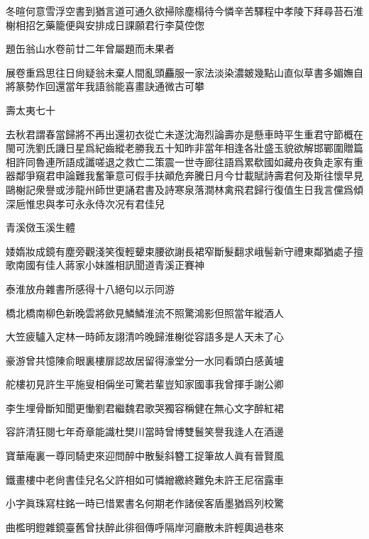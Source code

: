 \documentclass{zhvt-classic-Miya}
\begin{document}
冬暄何意雪浮空書到猶言道可通久欲掃除塵榻待今憐辛苦驛程中孝陵下拜尋苔石淮榭相招乞藥籠便與安排成日課願君行李莫倥偬

\begin{fw}題缶翁山水卷前廿二年曾屬題而未果者\end{fw}

展卷重爲思往日尙疑翁未棄人間亂頭麤服一家法淡染濃皴幾點山直似草書多媚嫵自將篆勢作回還當年我語翁能喜畫訣通微古可攀

\begin{fw}壽太夷七十\end{fw}

去秋君謂春當歸將不再出還初衣從亡未遂沈海烈論壽亦是懸車時平生重君守節概在閩可洗劉氏譏日星爲紀齒縱老勝我五十知昨非當年相逢各壯盛玉貌欲解邯鄲圍贈篇相許同魯連所語成讖嗟退之救亡二策震一世寺廊往語爲累欷國如藏舟夜負走家有重器鄰爭窺君申論難我奮筆意可假手扶顚危奔騰日月今廿載賦詩壽君何及斯往懷早見鷗榭記衆譽或涉龍州師世更誦君書及詩寒泉落澗林禽飛君歸行復值生日我言儻爲傾深巵惟忠與孝可永永侍次况有君佳兒

\begin{fw}青溪傚玉溪生體\end{fw}

婑媠妝成鏡有塵旁觀淺笑復輕顰束腰欲謝長裙窄斷髮翻求峨髻新守禮東鄰猶處子擅歌南國有佳人蔣家小妹誰相訊聞道青溪正賽神

\begin{fw}泰淮放舟雜書所感得十八絕句以示同游\end{fw}

橋北橋南柳色新晚雲將歛見鱗鱗淮流不照驚鴻影但照當年縱酒人

大笠疲驢入定林一時師友詡清吟晚歸淮榭從容語多是人天未了心

豪游曾共憶陳俞眼裏樓扉認故居留得濠堂分一水同看頭白感黃壚

舵樓初見許生平施叟相偁坐可驚若輩豈知家國事我曾揮手謝公卿

李生埋骨斷知聞更慟劉君繼魏君歌哭獨容稱健在無心文字醉紅裙

容許清狂閱七年奇章能識杜樊川當時曾博雙鬟笑譽我逢人在酒邊

寶華庵裏一尊同騎吏來迎問醉中散髮斜簪工捉筆故人眞有晉賢風

鐵畫樓中老尙書佳兒名父許相如可憐繒繳終難免未許王尼宿露車

小字眞珠寫柱銘一時已惜累書名何期老作諸侯客盾墨猶爲列校驚

曲檻明鐙雜鏡臺舊曾扶醉此徘徊傳呼隔岸河廳散未許輕輿過巷來
\end{document}
